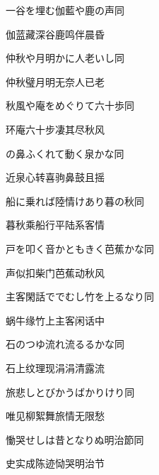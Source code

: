 \begin{haiku}
    {\FH 一谷を埋む伽藍や鹿の声}\hfill{\FH 同}

    {\FK 伽蓝藏深谷鹿鸣伴晨昏}
\end{haiku}

\begin{haiku}
    {\FH 仲秋や月明かに人老いし}\hfill{\FH 同}

    {\FK 仲秋璧月明无奈人已老}
\end{haiku}

\begin{haiku}
    {\FH 秋風や庵をめぐりて六十歩}\hfill{\FH 同}

    {\FK 环庵六十步凄其尽秋风}
\end{haiku}

\begin{haiku}
    {\FH {}の鼻ふくれて動く泉かな}\hfill{\FH 同}

    {\FK 近泉心转喜驹鼻鼓且摇}
\end{haiku}

\begin{haiku}
    {\FH 船に乗れば陸情けあり暮の秋}\hfill{\FH 同}

    {\FK 暮秋乘船行平陆系客情}
\end{haiku}

\begin{haiku}
    {\FH 戸を叩く音かともきく芭蕉かな}\hfill{\FH 同}

    {\FK 声似扣柴门芭蕉动秋风}
\end{haiku}

\begin{haiku}
    {\FH 主客閑話ででむし竹を上るなり}\hfill{\FH 同}

    {\FK 蜗牛缘竹上主客闲话中}
\end{haiku}

\begin{haiku}
    {\FH 石のつゆ流れ流るるかな}\hfill{\FH 同}

    {\FK 石上纹理现涓涓清露流}
\end{haiku}

\begin{haiku}
    {\FH 旅悲しとびかうばかりけり}\hfill{\FH 同}

    {\FK 唯见柳絮舞旅情无限愁}
\end{haiku}

\begin{haiku}
    {\FH 慟哭せしは昔となりぬ明治節}\hfill{\FH 同}

    {\FK 史实成陈迹恸哭明治节}
\end{haiku}

